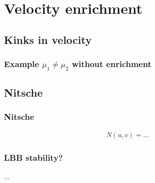 \section{Velocity enrichment}

\subsection{Kinks in velocity}

\begin{frame}
  \frametitle{Example $\mu_1 \neq \mu_2$ without enrichment}
  \begin{block}{}
  \end{block}
\end{frame}


\subsection{Nitsche}

\begin{frame}
  \frametitle{Nitsche}
  \begin{block}{}
    \begin{align}
      N(u,v) = ...
    \end{align}
  \end{block}
\end{frame}

\begin{frame}
  \frametitle{LBB stability?}
  \begin{block}{}
    ...
  \end{block}
\end{frame}

